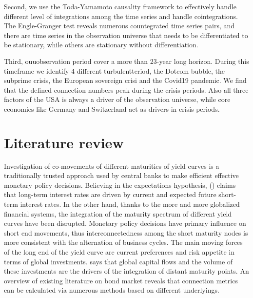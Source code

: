 \documentclass[12pt,bibliography=totoc]{article}
\begin{document}
Second, we use the Toda-Yamamoto causality framework to effectively handle different level of integrations among the time series and handle cointegrations. The Engle-Granger test reveals numerous countegrated time series pairs, and there are time series in the observation universe that needs to be differentiated to be stationary, while others are stationary without differentiation.

Third, ouuobservation period cover a more than 23-year long horizon. During this timeframe we identify 4 different turbulentteriod, the Dotcom bubble, the subprime crisis, the European sovereign crisi and the Covid19 pandemic. We find that the defined connection numbers peak during the crisis periods. Also all three factors of the USA is always a driver of the observation universe, while core economies like Germany and Switzerland act as drivers in crisis periods.

\section{Literature review}
Investigation of co-movements of different maturities of yield curves is a traditionally trusted approach used by central banks to make efficient effective monetary policy decisions.
Believing in the expectations hypothesis, (\cite{laopodis2004monetary}) claims that long-term interest rates are driven by current and expected future short-term interest rates.
In the other hand, thanks to the more and more globalized financial systems, the integration of the maturity spectrum of different yield curves have been disrupted.
Monetary policy decisions have primary influence on short end movements, thus interconnectedness among the short maturity nodes is more consistent with the alternation of business cycles.
The main moving forces of the long end of the yield curve are current preferences and risk appetite in terms of global investments. 
\cite{ilmanen1995time} says that global capital flows and the volume of these investments are the drivers of the integration of distant maturity points.
An overview of existing literature on bond market reveals that connection metrics can be calculated via numerous methods based on different underlyings. 
\end{document}
